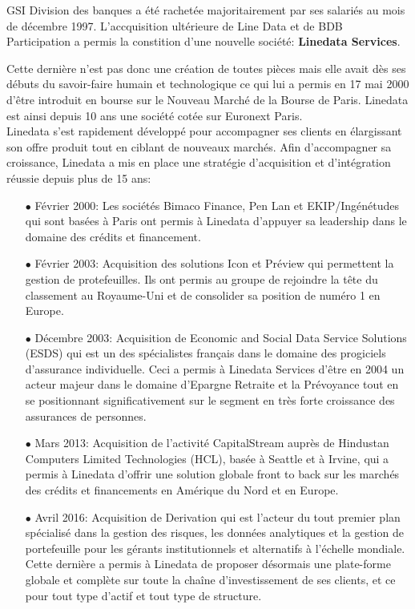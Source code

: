GSI Division des banques a été rachetée majoritairement par ses salariés au mois de décembre 1997. L'accquisition ultérieure de Line Data et de BDB Participation a permis la constition d'une nouvelle société: \textbf{Linedata Services}.

Cette dernière n'est pas donc une création de toutes pièces mais elle avait dès ses débuts du savoir-faire humain et technologique ce qui lui a permis en 17 mai 2000 d'être introduit en bourse sur le Nouveau Marché de la Bourse de Paris. Linedata est ainsi depuis 10 ans une société cotée sur Euronext Paris.\\

Linedata s'est rapidement développé pour accompagner ses clients en élargissant son offre produit tout en ciblant de nouveaux marchés. Afin d'accompagner sa croissance, Linedata a mis en place une stratégie d'acquisition et d'intégration réussie depuis plus de 15 ans:\\
\begin{itemize}
    \item[$\bullet$] Février 2000: Les sociétés Bimaco Finance, Pen Lan et EKIP/Ingénétudes qui sont basées à Paris ont permis à Linedata d'appuyer sa leadership dans le domaine des crédits et financement.\\
    \item[$\bullet$] Février 2003: Acquisition des solutions Icon et Préview qui permettent la gestion de protefeuilles. Ils ont permis au groupe de rejoindre la tête du classement au Royaume-Uni et de consolider sa position de numéro 1 en Europe.\\
    \item[$\bullet$] Décembre 2003: Acquisition de Economic and Social Data Service Solutions (ESDS) qui est un des spécialistes français dans le domaine des progiciels d'assurance individuelle. Ceci a permis à Linedata Services d'être en 2004 un acteur majeur dans le domaine d'Epargne Retraite et la Prévoyance tout en se positionnant significativement sur le segment en très forte croissance des assurances de personnes.\\
    \item[$\bullet$] Mars 2013: Acquisition de l'activité CapitalStream auprès de  Hindustan Computers Limited Technologies (HCL), basée à Seattle et à Irvine, qui a permis à Linedata d'offrir une solution globale front to back sur les marchés des crédits et financements en Amérique du Nord et en Europe.\\
    \item[$\bullet$] Avril 2016: Acquisition de Derivation qui est l'acteur du tout premier plan spécialisé dans la gestion des risques, les données analytiques et la gestion de portefeuille pour les gérants institutionnels et alternatifs à l'échelle mondiale. Cette dernière a permis à Linedata de proposer désormais une plate-forme globale et complète sur toute la chaîne d'investissement de ses clients, et ce pour tout type d'actif et tout type de structure.\\
\end{itemize}

